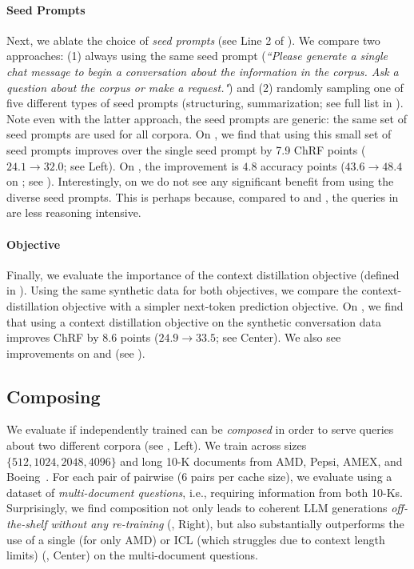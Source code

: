\paragraph{\method Seed Prompts} Next, we ablate the choice of \textit{seed prompts} (see Line 2 of ).
We compare two approaches: (1) always using the same seed prompt (\textit{``Please generate a single chat message to begin a conversation about the information in the corpus. Ask a question about the corpus or make a request."}) and (2) randomly sampling one of five different types  of seed prompts (\eg structuring, summarization; see full list in ). Note even with the latter approach, the seed prompts are generic: the same set of seed prompts are used for all corpora.
On \mtob, we find that using this small set of seed prompts improves over the single seed prompt by 7.9 ChRF points ($24.1 \rightarrow 32.0$; see  Left).
On \longhealth, the improvement is $4.8$ accuracy points ($43.6 \rightarrow 48.4$ on \longhealth; see ).
Interestingly, on \qasper we do not see any significant benefit from using the diverse seed prompts. This is perhaps because, compared to \longhealth and \mtob, the queries in \qasper are less reasoning intensive.
\paragraph{\method Objective} Finally, we evaluate the importance of the context distillation objective (defined in ).
Using the same \method synthetic data for both objectives, we compare the context-distillation objective with a simpler next-token prediction objective.
On \mtob, we find that using a context distillation objective on the synthetic conversation data improves ChRF by $8.6$ points ($24.9 \rightarrow 33.5$; see  Center).
We also see improvements on \longhealth and \qasper (see ).
\vspace{-2mm}
\subsection{Composing \artifacts}
\label{sec:results-composition}
\ifx\conference\neuripsconf

\fi
\ifx\conference\arxivconf

\fi
We evaluate if independently trained \artifacts can be \textit{composed} in order to serve queries about two different
corpora (see , Left).
We train \artifacts across sizes $\{512, 1024, 2048, 4096\}$ and long 10-K documents from AMD, Pepsi, AMEX, and Boeing~\cite{islam2023financebench}.
For each pair of \artifacts pairwise (6 pairs per cache size), we evaluate using a dataset of \textit{multi-document questions}, i.e., requiring information from both 10-Ks.
Surprisingly, we find composition not only leads to coherent LLM generations \textit{off-the-shelf without any re-training} (, Right), but also substantially outperforms the use of a single \artifact (\ie for only AMD) or ICL (which struggles due to context length limits) (, Center) on the multi-document questions.
\vspace{-2mm}
